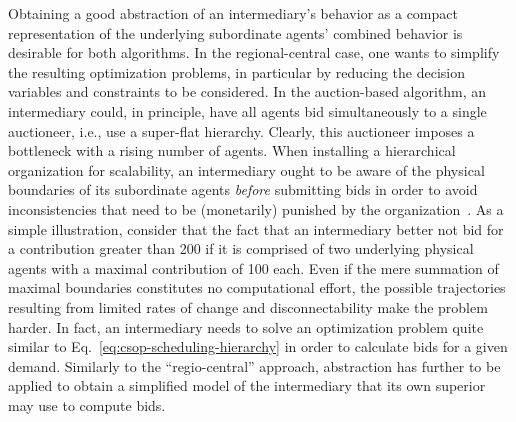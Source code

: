 \documentclass[conference]{IEEEtran}
\newcommand{\eref}[1]{Eq.~\ref{#1}}
\begin{document}
Obtaining a good abstraction of an intermediary's behavior as a compact
representation of the underlying subordinate agents' combined behavior is desirable for both algorithms.
In the regional-central case, one wants to simplify the resulting optimization problems, in particular
by reducing the decision variables and constraints to be considered. In the auction-based algorithm, 
an intermediary could, in principle, have all agents bid simultaneously to a single auctioneer, i.e., 
use a super-flat hierarchy. Clearly, this auctioneer imposes a bottleneck with
a rising number of agents. %
When installing a hierarchical organization for scalability, an intermediary
ought to be aware of the physical boundaries of its subordinate agents \emph{before} submitting bids 
in order to avoid inconsistencies that need to be (monetarily) punished by the organization~\cite{Anders-TAAS-2015}.
As a simple illustration, consider that the fact that an intermediary better not bid for a contribution
greater than 200 if it is comprised of two underlying physical agents with a maximal contribution of
100 each. Even if the mere summation of maximal boundaries constitutes no computational effort, 
the possible trajectories resulting from limited rates of change and disconnectability make 
the problem harder. In fact, an intermediary needs to solve an optimization problem quite similar 
to \eref{eq:csop-scheduling-hierarchy} in order to calculate bids for a given demand.
Similarly to the ``regio-central'' approach, abstraction has further to be applied to obtain a simplified model of the intermediary that its
own superior may use to compute bids.
\end{document}

